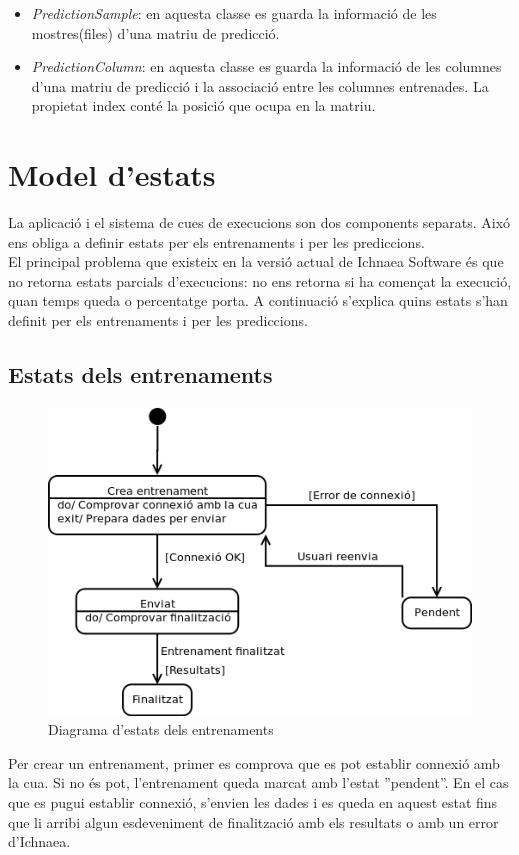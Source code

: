 \begin{itemize}
\item \textit{PredictionSample}: en aquesta classe es guarda la informaci\'{o} de les mostres(files) d'una matriu de predicci\'{o}.

\item \textit{PredictionColumn}: en aquesta classe es guarda la informaci\'{o} de les columnes d'una matriu de predicci\'{o} i la associaci\'{o} entre les columnes entrenades. La propietat index cont\'{e} la posició que ocupa en la matriu.
\end{itemize}

\section{Model d'estats}
\label{sec:status}
La aplicaci\'{o} i el sistema de cues de execucions son dos components separats. Aix\'{o} ens obliga a definir estats per els entrenaments i per les prediccions.\\

El principal problema que existeix en la versi\'{o} actual de Ichnaea Software \'{e}s que no retorna estats parcials d'execucions: no ens retorna si ha començat la execució, quan temps queda o percentatge porta. A continuaci\'{o} s'explica quins estats s'han definit per els entrenaments i per les prediccions.

\subsection{Estats dels entrenaments}
\begin{figure}[H]
  \centering
  \includegraphics[scale=0.4]{img/specification/StatesTraining.png}
  \caption{Diagrama d'estats dels entrenaments}
  \label{fig:statestraining}
\end{figure}
Per crear un entrenament, primer es comprova que es pot establir connexi\'{o} amb la cua. Si no \'{e}s pot, l'entrenament queda marcat amb l'estat ''pendent''. En el cas que es pugui establir connexi\'{o}, s'envien les dades i es queda en aquest estat fins que li arribi algun esdeveniment de finalitzaci\'{o} amb els resultats o amb un error d'Ichnaea.\\


